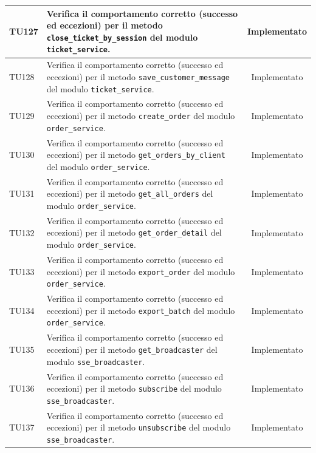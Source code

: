 \documentclass[a4paper,11pt,oneside]{scrartcl}
\begin{document}
\begin{longtable}{|p{1.9cm}|p{11.6cm}|c|}
    TU127           & Verifica il comportamento corretto (successo ed eccezioni) per il metodo \texttt{close\_ticket\_by\_session} del modulo \texttt{ticket\_service}.            & Implementato   \\ \hline
    TU128           & Verifica il comportamento corretto (successo ed eccezioni) per il metodo \texttt{save\_customer\_message} del modulo \texttt{ticket\_service}.               & Implementato   \\ \hline
    TU129           & Verifica il comportamento corretto (successo ed eccezioni) per il metodo \texttt{create\_order} del modulo \texttt{order\_service}.                          & Implementato   \\ \hline
    TU130           & Verifica il comportamento corretto (successo ed eccezioni) per il metodo \texttt{get\_orders\_by\_client} del modulo \texttt{order\_service}.                & Implementato   \\ \hline
    TU131           & Verifica il comportamento corretto (successo ed eccezioni) per il metodo \texttt{get\_all\_orders} del modulo \texttt{order\_service}.                       & Implementato   \\ \hline
    TU132           & Verifica il comportamento corretto (successo ed eccezioni) per il metodo \texttt{get\_order\_detail} del modulo \texttt{order\_service}.                     & Implementato   \\ \hline
    TU133           & Verifica il comportamento corretto (successo ed eccezioni) per il metodo \texttt{export\_order} del modulo \texttt{order\_service}.                          & Implementato   \\ \hline
    TU134           & Verifica il comportamento corretto (successo ed eccezioni) per il metodo \texttt{export\_batch} del modulo \texttt{order\_service}.                          & Implementato   \\ \hline
    TU135           & Verifica il comportamento corretto (successo ed eccezioni) per il metodo \texttt{get\_broadcaster} del modulo \texttt{sse\_broadcaster}.                     & Implementato   \\ \hline
    TU136           & Verifica il comportamento corretto (successo ed eccezioni) per il metodo \texttt{subscribe} del modulo \texttt{sse\_broadcaster}.                            & Implementato   \\ \hline
    TU137           & Verifica il comportamento corretto (successo ed eccezioni) per il metodo \texttt{unsubscribe} del modulo \texttt{sse\_broadcaster}.                          & Implementato   \\ \hline

\end{longtable}
\end{document}
